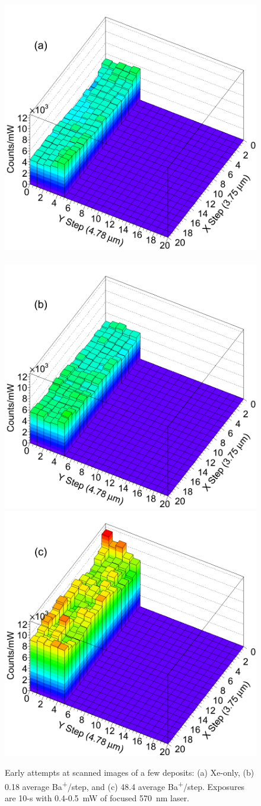 \begin{figure} %
        \centering
                \includegraphics[width=.5\textwidth]{figures/scan_a.png}
                ~
                \includegraphics[width=.5\textwidth]{figures/scan_b.png}
                \includegraphics[width=.5\textwidth]{figures/scan_c.png}
                \caption{Early attempts at scanned images of a few deposits: (a) Xe-only, (b) 0.18 average Ba\textsuperscript{+}/step, and (c) 48.4 average Ba\textsuperscript{+}/step.  Exposures are 10-s with 0.4-0.5~mW of focused 570~nm laser.}
\label{fig:scans}
\end{figure}

